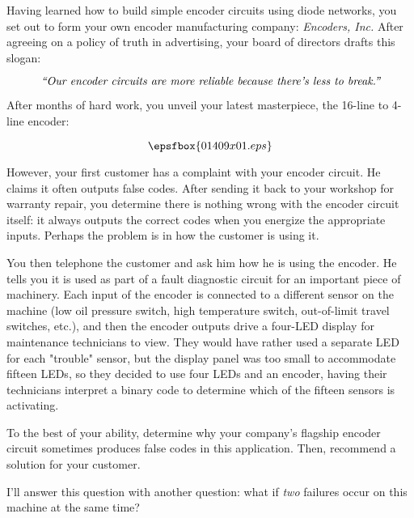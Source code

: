 

Having learned how to build simple encoder circuits using diode networks, you set out to form your own encoder manufacturing company: {\it Encoders, Inc.}  After agreeing on a policy of truth in advertising, your board of directors drafts this slogan:

$$\hbox{\it ``Our encoder circuits are more reliable because there's less to break.''}$$

After months of hard work, you unveil your latest masterpiece, the 16-line to 4-line encoder:

$$\epsfbox{01409x01.eps}$$

However, your first customer has a complaint with your encoder circuit.  He claims it often outputs false codes.  After sending it back to your workshop for warranty repair, you determine there is nothing wrong with the encoder circuit itself: it always outputs the correct codes when you energize the appropriate inputs.  Perhaps the problem is in how the customer is using it.

You then telephone the customer and ask him how he is using the encoder.  He tells you it is used as part of a fault diagnostic circuit for an important piece of machinery.  Each input of the encoder is connected to a different sensor on the machine (low oil pressure switch, high temperature switch, out-of-limit travel switches, etc.), and then the encoder outputs drive a four-LED display for maintenance technicians to view.  They would have rather used a separate LED for each "trouble" sensor, but the display panel was too small to accommodate fifteen LEDs, so they decided to use four LEDs and an encoder, having their technicians interpret a binary code to determine which of the fifteen sensors is activating.

To the best of your ability, determine why your company's flagship encoder circuit sometimes produces false codes in this application.  Then, recommend a solution for your customer.







I'll answer this question with another question: what if {\it two} failures occur on this machine at the same time?

